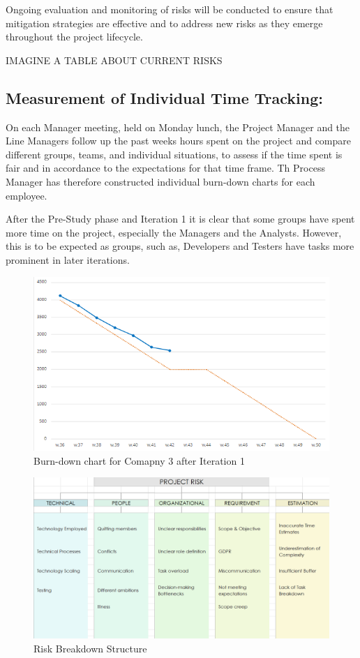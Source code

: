 Ongoing evaluation and monitoring of risks will be conducted to ensure that mitigation strategies are effective and to address new risks as they emerge throughout the project lifecycle.

IMAGINE A TABLE ABOUT CURRENT RISKS


\subsection{Measurement of Individual Time Tracking: }
On each Manager meeting, held on Monday lunch, the Project Manager and the Line Managers follow up the past weeks hours spent on the project and compare different groups, teams, and individual situations, to assess if the time spent is fair and in accordance to the expectations for that time frame. Th Process Manager has therefore constructed individual burn-down charts for each employee. 

After the Pre-Study phase and Iteration 1 it is clear that some groups have spent more time on the project, especially the Managers and the Analysts. However, this is to be expected as groups, such as, Developers and Testers have tasks more prominent in later iterations.

\begin{figure}[h]
    \centering
    \includegraphics[width=0.5\linewidth]{2024-10-16.png}
    \caption{Burn-down chart for Comapny 3 after Iteration 1}
    \label{fig:enter-label}
\end{figure}






\begin{figure}[h]
    \centering
    \includegraphics[width=1.0\linewidth]{Risk Diagram List.png}
    \caption{Risk Breakdown Structure}
    \label{fig:enter-label}
\end{figure}




